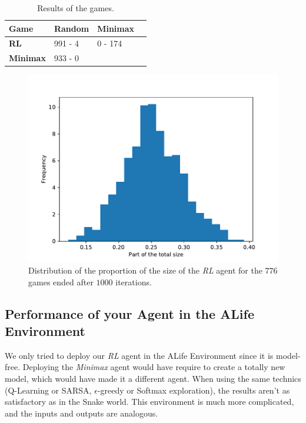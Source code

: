 \documentclass[journal, a4paper]{IEEEtran}
\begin{document}
\begin{table}[h]
	\caption{\label{comparative_table}Results of the games.}
	\centering
	\begin{tabular}{llll}
		\hline
        \textbf{Game} & \textbf{Random} & \textbf{Minimax}  \\
		\hline
        \textbf{RL} & 991 - 4 & 0 - 174 \\
        \textbf{Minimax} & 933 - 0 &  \\
		\hline
	\end{tabular}
\end{table}

\begin{figure}[h]
	\centering
    \includegraphics[width=0.95\columnwidth]{images/histo_size.pdf}
    \caption{\label{histo_size}Distribution of the proportion of the size of the \emph{RL} agent for the $776$ games ended after $1000$ iterations.}
\end{figure}



\subsection{Performance of your Agent in the ALife Environment}

We only tried to deploy our \emph{RL} agent in the ALife Environment since it is model-free.
Deploying the \emph{Minimax} agent would have require to create a totally new model, which would have made it a different agent.
When using the same technics (Q-Learning or SARSA, $\epsilon$-greedy or Softmax exploration), the results aren't as satisfactory as in the Snake world.
This environment is much more complicated, and the inputs and outputs are analogous.
\end{document}
